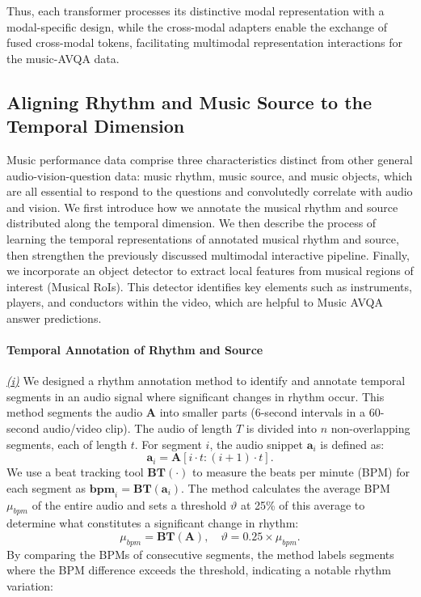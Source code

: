 \documentclass[11pt]{article}
\begin{document}
Thus, each transformer processes its distinctive modal representation with a modal-specific design, while the cross-modal adapters enable the exchange of fused cross-modal tokens, facilitating multimodal representation interactions for the music-AVQA data.

\subsection{Aligning Rhythm and Music Source to the Temporal Dimension}
Music performance data comprise three characteristics distinct from other general audio-vision-question data: music rhythm, music source, and music objects, which are all essential to respond to the questions and convolutedly correlate with audio and vision. 
We first introduce how we annotate the musical rhythm and source distributed along the temporal dimension. 
We then describe the process of learning the temporal representations of annotated musical rhythm and source, then strengthen the previously discussed multimodal interactive pipeline. Finally, we incorporate an object detector to extract local features from musical regions of interest (Musical RoIs). This detector identifies key elements such as instruments, players, and conductors within the video, which are helpful to Music AVQA answer predictions.

\paragraph{Temporal Annotation of Rhythm and Source}
\underline{\textit{(i)}} We designed a rhythm annotation method to identify and annotate temporal segments in an audio signal where significant changes in rhythm occur. This method segments the audio $\mathbf{A}$ into smaller parts (6-second intervals in a 60-second audio/video clip). The audio of length $T$ is divided into $n$ non-overlapping segments, each of length $t$.
For segment $i$, the audio snippet $\mathbf{a}_i$ is defined as:
\begin{equation}
\mathbf{a}_i = \mathbf{A}[i \cdot t : (i+1) \cdot t].
\end{equation}
We use a beat tracking tool $\mathbf{BT}(\cdot)$ to measure the beats per minute (BPM) for each segment as
$\mathbf{bpm}_i = \mathbf{BT}(\mathbf{a}_i)$.
The method calculates the average BPM $\mu_{bpm}$ of the entire audio and sets a threshold $\vartheta$ at 25\% of this average to determine what constitutes a significant change in rhythm:
\begin{equation}
\mu_{bpm} = \mathbf{BT}(\mathbf{A}), \quad \vartheta = 0.25 \times \mu_{bpm}.
\end{equation}
By comparing the BPMs of consecutive segments, the method labels segments where the BPM difference exceeds the threshold, indicating a notable rhythm variation:
\end{document}
